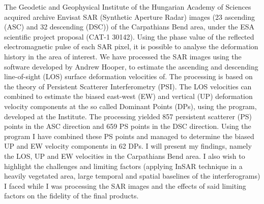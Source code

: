 \documentclass[a0, portrait]{a0poster}
\begin{document}
\begin{mdframed}[linecolor=blue!50!black, linewidth=4pt,
    innerleftmargin=20pt, innerrightmargin=20pt,
    innerbottommargin=25pt, innertopmargin=30pt,
    backgroundcolor=blue!2.5!white,
    frametitleaboveskip=15pt, frametitlebelowskip=15pt,
    roundcorner=20pt, frametitle={\LARGE Abstract},
    frametitlealignment=\center]

The Geodetic and Geophysical Institute of the Hungarian Academy of Sciences acquired archive Envisat SAR (Synthetic Aperture Radar) images (23 ascending (ASC) and 32 descending (DSC)) of the Carpathians Bend area, under the ESA scientific project proposal (CAT-1 30142). Using the phase value of the reflected electromagnetic pulse of each SAR pixel, it is possible to analyse the deformation history in the area of interest. We have processed the SAR images using the \stamps software developed by Andrew Hooper, to estimate the ascending and descending line-of-sight (LOS) surface deformation velocities of. The \stamps processing is based on the theory of Persistent Scatterer Interferometry (PSI). The LOS velocities can combined to estimate the biased east-west (EW) and vertical (UP) deformation velocity components at the so called Dominant Points (DPs), using the \daisy program, developed at the Institute. The \stamps processing yielded 857 persistent scatterer (PS) points in the ASC direction and 659 PS points in the DSC direction. Using the \daisy program I have combined these PS points and managed to determine the biased UP and EW velocity components in 62 DPs. I will present my findings, namely the LOS, UP and EW velocities in the Carpathians Bend area. I also wish to highlight the challenges and limiting factors (applying InSAR technique in a heavily vegetated area, large temporal and spatial baselines of the interferograms) I faced while I was processing the SAR images and the effects of said limiting factors on the fidelity of the final products.

\end{mdframed}

\vspace{50pt}
\end{document}
